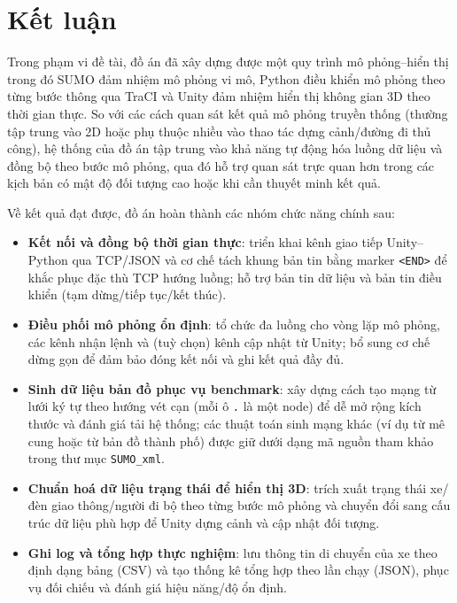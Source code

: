 \documentclass[../DoAn.tex]{subfiles}
\begin{document}
\section{Kết luận}
Trong phạm vi đề tài, đồ án đã xây dựng được một quy trình mô phỏng--hiển thị trong đó SUMO đảm nhiệm mô phỏng vi mô, Python điều khiển mô phỏng theo từng bước thông qua TraCI và Unity đảm nhiệm hiển thị không gian 3D theo thời gian thực. So với các cách quan sát kết quả mô phỏng truyền thống (thường tập trung vào 2D hoặc phụ thuộc nhiều vào thao tác dựng cảnh/đường đi thủ công), hệ thống của đồ án tập trung vào khả năng tự động hóa luồng dữ liệu và đồng bộ theo bước mô phỏng, qua đó hỗ trợ quan sát trực quan hơn trong các kịch bản có mật độ đối tượng cao hoặc khi cần thuyết minh kết quả.

Về kết quả đạt được, đồ án hoàn thành các nhóm chức năng chính sau:
\begin{itemize}[leftmargin=2em]
	\item \textbf{Kết nối và đồng bộ thời gian thực}: triển khai kênh giao tiếp Unity--Python qua TCP/JSON và cơ chế tách khung bản tin bằng marker \texttt{<END>} để khắc phục đặc thù TCP hướng luồng; hỗ trợ bản tin dữ liệu và bản tin điều khiển (tạm dừng/tiếp tục/kết thúc).
	\item \textbf{Điều phối mô phỏng ổn định}: tổ chức đa luồng cho vòng lặp mô phỏng, các kênh nhận lệnh và (tuỳ chọn) kênh cập nhật từ Unity; bổ sung cơ chế dừng gọn để đảm bảo đóng kết nối và ghi kết quả đầy đủ.
	\item \textbf{Sinh dữ liệu bản đồ phục vụ benchmark}: xây dựng cách tạo mạng từ lưới ký tự theo hướng vét cạn (mỗi ô \texttt{.} là một node) để dễ mở rộng kích thước và đánh giá tải hệ thống; các thuật toán sinh mạng khác (ví dụ từ mê cung hoặc từ bản đồ thành phố) được giữ dưới dạng mã nguồn tham khảo trong thư mục \texttt{SUMO\_xml}.
	\item \textbf{Chuẩn hoá dữ liệu trạng thái để hiển thị 3D}: trích xuất trạng thái xe/đèn giao thông/người đi bộ theo từng bước mô phỏng và chuyển đổi sang cấu trúc dữ liệu phù hợp để Unity dựng cảnh và cập nhật đối tượng.
	\item \textbf{Ghi log và tổng hợp thực nghiệm}: lưu thông tin di chuyển của xe theo định dạng bảng (CSV) và tạo thống kê tổng hợp theo lần chạy (JSON), phục vụ đối chiếu và đánh giá hiệu năng/độ ổn định.
\end{itemize}
\end{document}
